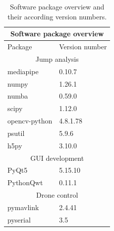 \begin{table}[h!]
    \centering
    \begin{tabular}[c]{|p{6cm}|p{6cm}|}
    \hline
    \multicolumn{2}{|c|}{\cellcolor{gray!20}Software package overview}\\
    \hline
    Package & Version number\\
    \hline
    \hline
    \multicolumn{2}{|c|}{\cellcolor{cyan!15}Jump analysis}\\
    \hline
    mediapipe & 0.10.7\\
    \hline
    numpy & 1.26.1\\
    \hline
    numba & 0.59.0\\
    \hline
    scipy & 1.12.0\\
    \hline
    opencv-python & 4.8.1.78\\
    \hline
    psutil & 5.9.6\\ 
    \hline
    h5py & 3.10.0\\
    \hline
    \multicolumn{2}{|c|}{\cellcolor{cyan!15}\acs*{GUI} development}\\
    \hline
    PyQt5 & 5.15.10\\
    \hline
    PythonQwt & 0.11.1\\
    \hline
    \multicolumn{2}{|c|}{\cellcolor{cyan!15}Drone control}\\
    \hline
    pymavlink & 2.4.41\\
    \hline
    pyserial & 3.5\\
    \hline
    \end{tabular}
    \caption[Software overview]{Software package overview and their according
    version numbers.}
    \label{table:3_software_overview_version_num}
\end{table}
\FloatBarrier


